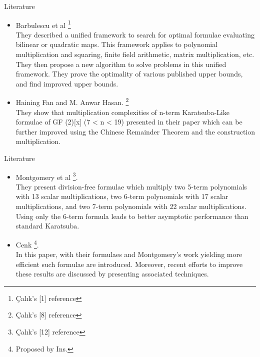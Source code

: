 \documentclass[12pt]{beamer}
\begin{document}
\begin{frame}{Literature}

\begin{itemize}
  \item Barbulescu et al \footnote{Çalık's [1] reference} \\
  They described a unified framework to search for optimal formulae evaluating bilinear or quadratic maps. This framework applies to polynomial multiplication and squaring, finite field arithmetic, matrix multiplication, etc. They then propose a new algorithm to solve problems in this unified framework. They prove the optimality of various published upper bounds, and find improved upper bounds.

  \item Haining Fan and M. Anwar Hasan. \footnote{Çalık's [8] reference}\\
  They show that multiplication complexities of n-term Karatsuba-Like formulae of GF (2)[x] (7 < n < 19) presented in their paper which can be further improved using the Chinese Remainder Theorem and the construction multiplication.
  
\end{itemize}

\vskip 1cm



\end{frame}


\begin{frame}{Literature}
\begin{itemize}
\item Montgomery et al \footnote{Çalık's [12] reference}.\\
  They present division-free formulae which multiply two 5-term polynomials with 13 scalar multiplications, two 6-term polynomials with 17 scalar multiplications, and two 7-term polynomials with 22 scalar multiplications. Using only the 6-term formula leads to better asymptotic performance than standard Karatsuba.

  
  \item Cenk \footnote{Proposed by Ins.}.\\
   In this paper, with their formulaes and Montgomery’s work yielding more efficient such formulae are introduced. Moreover, recent efforts to improve these results are discussed by presenting associated techniques.
\end{itemize}
\end{frame}
\end{document}
